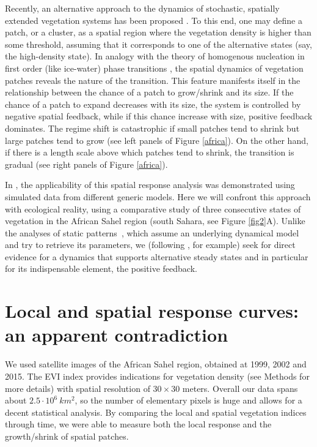 \documentclass[aps,pre,twocolumn]{revtex4-1}
\begin{document}
   Recently, an alternative approach to the dynamics of stochastic, spatially extended vegetation systems has been proposed  \cite{weissmann2016predicting}. To this end, one may define a  patch, or a  cluster, as a spatial region where the vegetation density is higher than some threshold, assuming that it corresponds to one of the alternative states (say, the high-density state). In  analogy with the theory of homogenous nucleation in  first order (like ice-water) phase transitions \cite{kelton1991crystal}, the spatial dynamics of vegetation patches reveals the nature of the transition.  This feature manifests itself in the relationship between  the chance of a patch to grow/shrink and its size. If the chance of a patch to expand decreases with its size, the system is controlled by negative spatial feedback, while if this chance increase with size, positive feedback dominates. The regime shift is catastrophic if small patches tend to shrink but large patches tend to grow (see left panels of Figure \ref{africa}). On the other hand, if there is a length scale above which patches tend to shrink, the transition is gradual (see right panels of Figure \ref{africa}).


In  \cite{weissmann2016predicting}, the applicability of this spatial response analysis was demonstrated using simulated data from different generic models. Here we will confront this  approach with ecological reality, using a comparative study of three consecutive states of vegetation in the African Sahel region (south Sahara, see Figure \ref{fig2}A).  Unlike the analyses of static patterns~\cite{hirota2011global,staal2015synergistic,berdugo2017plant}, which assume an underlying dynamical model and try to retrieve its parameters, we (following \cite{dai2013slower}, for example) seek for direct evidence for a dynamics that supports alternative steady states and in particular for its indispensable element, the positive feedback.

\section{Local and spatial response curves: an apparent contradiction}

  We used satellite images of the African Sahel region, obtained at 1999, 2002 and 2015. The EVI index  provides  indications for vegetation density (see Methods for more details) with spatial resolution of $30 \times 30$ meters. Overall our data spans about $2.5 \cdot 10^6 \  km^2$, so the number of elementary pixels is huge and allows for a decent statistical analysis. By comparing the local and spatial  vegetation indices through time, we were able to measure both the local response and the growth/shrink of spatial patches.
\end{document}
